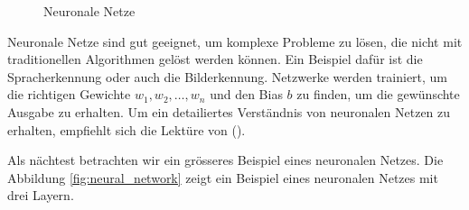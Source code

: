 \documentclass[11pt,a4paper]{article}
\begin{document}
\begin{figure}[h]
	\centering
	
	\caption{Neuronale Netze}
	\label{fig:neuron}

\end{figure}

\noindent
Neuronale Netze sind gut geeignet, um komplexe Probleme zu lösen, die nicht mit traditionellen
Algorithmen gelöst werden können. Ein Beispiel dafür ist die Spracherkennung oder auch die
Bilderkennung. Netzwerke werden trainiert, um die richtigen Gewichte \(w_{1}, w_{2}, \dots, w_{n}\)
und den Bias \(b\) zu finden, um die gewünschte Ausgabe zu erhalten. Um ein detailiertes Verständnis
von neuronalen Netzen zu erhalten, empfiehlt sich die Lektüre von (\cite{weidman2019deep}).

\noindent
Als nächtest betrachten wir ein grösseres Beispiel eines neuronalen Netzes. Die Abbildung 
\ref{fig:neural_network} zeigt ein Beispiel eines neuronalen Netzes mit drei Layern.
\end{document}

